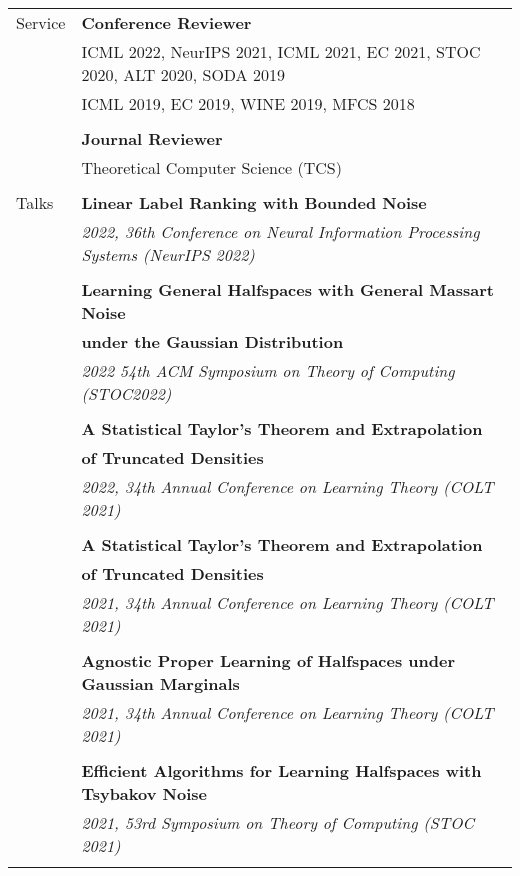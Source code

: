 \documentclass[letterpaper,11pt,oneside]{article}
\begin{document}
\begin{longtable}{@{} l l}
  \Large{Service} &\textbf{Conference Reviewer}\\

    & ICML 2022, NeurIPS 2021, ICML 2021, EC 2021, STOC 2020, ALT 2020, SODA 2019 \\ 
    & ICML 2019, EC 2019, WINE 2019, MFCS 2018 \\
    &\\

    &\textbf{Journal Reviewer}\\
    & Theoretical Computer Science (TCS)\\
    & \\

 \Large{Talks}
 &\textbf{Linear Label Ranking with Bounded Noise}\\ 
& \emph{2022, 36th Conference on Neural Information Processing Systems (NeurIPS 2022)} \\
 & \\

 &\textbf{Learning General Halfspaces with General Massart Noise}\\
 & \textbf{under the Gaussian Distribution}\\
 & \emph{2022 54th ACM Symposium on Theory of Computing (STOC2022)}\\
 & \\

 &\textbf{A Statistical Taylor's Theorem and Extrapolation}\\
 & \textbf{of Truncated Densities}\\
 & \emph{2022, 34th Annual Conference on Learning Theory (COLT 2021)} \\
 & \\

 &\textbf{A Statistical Taylor's Theorem and Extrapolation}\\
 & \textbf{of Truncated Densities}\\
 & \emph{2021, 34th Annual Conference on Learning Theory (COLT 2021)} \\
 & \\

 &\textbf{Agnostic Proper Learning of Halfspaces under Gaussian Marginals}\\
 & \emph{2021, 34th Annual Conference on Learning Theory (COLT 2021)} \\
 & \\

 &\textbf{Efficient Algorithms for Learning Halfspaces with Tsybakov Noise} \\
 & \emph{2021, 53rd Symposium on Theory of Computing (STOC 2021)} \\
 & \\


\end{longtable}
\end{document}
